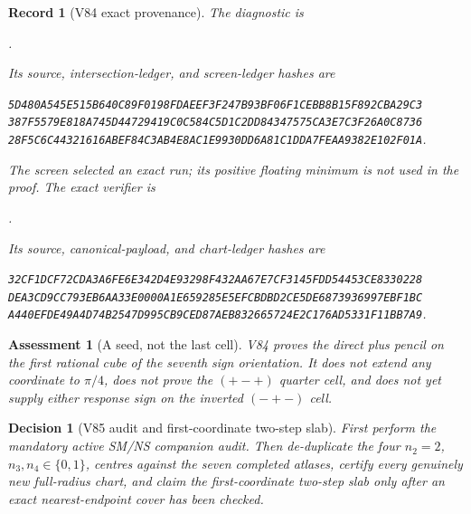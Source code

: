 \documentclass[11pt,oneside]{article}
\newtheorem{assessment}[theorem]{Assessment}
\newtheorem{record}[theorem]{Record}
\newtheorem{decision}[theorem]{Decision}
\theoremstyle{definition}
\theoremstyle{remark}
\begin{document}
\begin{record}[V84 exact provenance]
\label{rec:newv84-provenance}
The diagnostic is
\begin{center}\footnotesize
{}.
\end{center}
Its source, intersection-ledger, and screen-ledger hashes are
\begin{center}\scriptsize
\texttt{5D480A545E515B640C89F0198FDAEEF3F247B93BF06F1CEBB8B15F892CBA29C3}\\
\texttt{387F5579E818A745D44729419C0C584C5D1C2DD84347575CA3E7C3F26A0C8736}\\
\texttt{28F5C6C44321616ABEF84C3AB4E8AC1E9930DD6A81C1DDA7FEAA9382E102F01A}.
\end{center}
The screen selected an exact run; its positive floating minimum is
not used in the proof.  The exact verifier is
\begin{center}\footnotesize
{}.
\end{center}
Its source, canonical-payload, and chart-ledger hashes are
\begin{center}\scriptsize
\texttt{32CF1DCF72CDA3A6FE6E342D4E93298F432AA67E7CF3145FDD54453CE8330228}\\
\texttt{DEA3CD9CC793EB6AA33E0000A1E659285E5EFCBDBD2CE5DE6873936997EBF1BC}\\
\texttt{A440EFDE49A4D74B2547D995CB9CED87AEB832665724E2C176AD5331F11BB7A9}.
\end{center}
\end{record}

\begin{assessment}[A seed, not the last cell]
\label{ass:newv84}
V84 proves the direct plus pencil on the first rational cube of the
seventh sign orientation.  It does not extend any coordinate to
\(\pi/4\), does not prove the \((+-+)\) quarter cell, and does not
yet supply either response sign on the inverted \((-+-)\) cell.
\end{assessment}

\begin{decision}[V85 audit and first-coordinate two-step slab]
\label{dec:newv84-next}
First perform the mandatory active SM/NS companion audit.  Then
de-duplicate the four \(n_2=2\), \(n_3,n_4\in\{0,1\}\), centres
against the seven completed atlases, certify every genuinely new
full-radius chart, and claim the first-coordinate two-step slab
only after an exact nearest-endpoint cover has been checked.
\end{decision}
\end{document}
